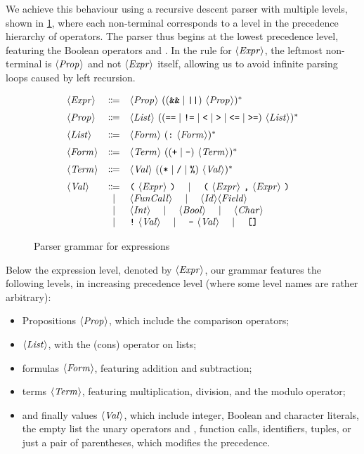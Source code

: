 We achieve this behaviour using a recursive descent parser with multiple levels,
shown in \cref{fig:new-expr-grammar}, where each non-terminal corresponds to a
level in the precedence hierarchy of operators.
%
The parser thus begins at the lowest precedence level, featuring the Boolean
operators \code{\&\&} and \code{||}.
In the rule for $\langle \textit{Expr}\kern.7pt \rangle$, the leftmost non-terminal is $\langle \textit{Prop}\kern.7pt \rangle$ and not
$\langle \textit{Expr}\kern.7pt \rangle$ itself, allowing us to avoid infinite parsing loops caused by left
recursion.
%
\begin{figure}[t]
  \[
  \begin{array}{lcl}
		\NT{Expr} & \Coloneqq & \NT{Prop}\ ((\code{\&\&} \mid \code{||})\ \NT{Prop})^* \br
		\NT{Prop} & \Coloneqq & \NT{List}\ ((\code{==} \mid \code{!=} \mid \code{<} \mid \code{>} \mid \code{<=} \mid \code{>=})\ \NT{List})^* \br
		\NT{List} & \Coloneqq & \NT{Form}\ (\code{:}\ \NT{Form})^* \br
		\NT{Form} & \Coloneqq & \NT{Term}\ (( \code{+} \mid \code{-} )\ \NT{Term})^* \br
		\NT{Term} & \Coloneqq & \NT{Val}\ (( \code{*} \mid \code{/} \mid \code{\%} )\ \NT{Val} )^* \br
		\NT{Val} & \Coloneqq & \code{(}\ \NT{Expr}\ \code{)} \ruleSep
      \code{(}\ \NT{Expr}\ \code{,}\ \NT{Expr}\ \code{)} \\
		& \mid & \NT{FunCall} \ruleSep
      \NT{Id} \NT{Field} \\
    & \mid & \NT{Int} \ruleSep \NT{Bool} \ruleSep \NT{Char} \\
		& \mid & \code{!}\ \NT{Val} \ruleSep \code{-}\ \NT{Val} \ruleSep \code{[]}
  \end{array}
  \]
  \caption{Parser grammar for expressions}
  \label{fig:new-expr-grammar}
\end{figure}
%
Below the expression level, denoted by $\langle \textit{Expr}\kern.7pt \rangle$, our grammar
features the following levels, in increasing precedence level (where some level
names are rather arbitrary):
\begin{itemize}
  \item Propositions $\langle \textit{Prop}\kern.7pt \rangle$, which include the comparison operators;
  \item $\langle \textit{List}\kern.7pt \rangle$, with the \spl{:} (cons) operator on lists;
  \item formulas $\langle \textit{Form}\kern.7pt \rangle$, featuring addition and subtraction;
  \item terms $\langle \textit{Term}\kern.7pt \rangle$, featuring multiplication, division, and the modulo
        operator;
  \item and finally values $\langle \textit{Val}\kern.7pt \rangle$, which include integer, Boolean and
        character literals, the empty list \spl{[]} the unary operators \spl{!}
        and \spl{-}, function calls, identifiers, tuples, or just a pair of
        parentheses, which modifies the precedence.
\end{itemize}

